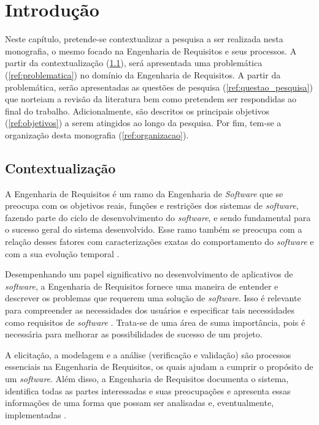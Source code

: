 \chapter[Introdução]{Introdução}

Neste capítulo, pretende-se contextualizar a pesquisa a ser realizada nesta monografia, o mesmo focado na Engenharia de Requisitos e seus processos. A partir da contextualização (\ref{ref:contextualizacao}), será apresentada uma problemática (\ref{ref:problematica}) no domínio da Engenharia de Requisitos. A partir da problemática, serão apresentadas as questões de pesquisa (\ref{ref:questao_pesquisa}) que norteiam a revisão da literatura bem como pretendem ser respondidas ao final do trabalho. Adicionalmente, são descritos os principais objetivos (\ref{ref:objetivos}) a serem atingidos ao longo da pesquisa. Por fim, tem-se a organização desta monografia (\ref{ref:organizacao}).

\label{chap:intro}

\section{Contextualização}

\label{ref:contextualizacao}

A Engenharia de Requisitos é um ramo da Engenharia de \textit{Software} que se preocupa com os objetivos reais, funções e restrições dos sistemas de \textit{software}, fazendo parte do ciclo de desenvolvimento do \textit{software}, e sendo fundamental para o sucesso geral do sistema desenvolvido. Esse ramo também se preocupa com a relação desses fatores com caracterizações exatas do comportamento do \textit{software} e com a sua evolução temporal \cite{elliott2012software}.

Desempenhando um papel significativo no desenvolvimento de aplicativos de \textit{software}, a Engenharia de Requisitos fornece uma maneira de entender e descrever os problemas que requerem uma solução de \textit{software}. Isso é relevante para compreender as necessidades dos usuários e especificar tais necessidades como requisitos de \textit{software} \cite{elliott2012software}. Trata-se de uma área de suma importância, pois é necessária para melhorar as possibilidades de sucesso de um projeto.

A elicitação, a modelagem e a análise (verificação e validação) são processos essenciais na Engenharia de Requisitos, os quais ajudam a cumprir o propósito de um \textit{software}. Além disso, a Engenharia de Requisitos documenta o sistema, identifica todas as partes interessadas e suas preocupações e apresenta essas informações de uma forma que possam ser analisadas e, eventualmente, implementadas \cite{elliott2012software}.

